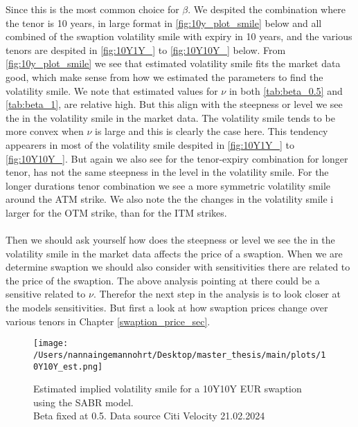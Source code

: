 Since this is the most common choice for $\beta$. We despited the combination where the tenor is 10 years, in large format in 
\autoref{fig:10y_plot_smile} below and all combined of the swaption volatility smile with expiry in 10 years, and the 
various tenors are despited in \autoref{fig:10Y1Y_} to \autoref{fig:10Y10Y_} below. 
From \autoref{fig:10y_plot_smile}  we see that estimated volatility smile fits the market data good, which make sense from 
how we estimated the parameters to find the volatility smile. We note that estimated values for $\nu$ in both 
\autoref{tab:beta_0.5} and \autoref{tab:beta_1}, are relative high. But this align with the steepness or level we see the in the 
volatility smile in the market data. The volatility smile tends to be more convex when $\nu$ is large and this is clearly 
the case here. This tendency appearers in  most of the volatility smile despited in \autoref{fig:10Y1Y_} to \autoref{fig:10Y10Y_}.
But again we also see for the tenor-expiry combination for longer tenor, has not the same steepness in the level in 
the volatility smile. For the longer durations tenor combination we see a more symmetric volatility smile around the
ATM strike. We also note the the changes in the volatility smile i larger for the OTM strike, than for the ITM strikes. 
\\\\
Then we should ask yourself how does the  steepness or level we see the in the 
volatility smile in the market data affects the price of a swaption. When we are determine swaption we should also consider 
with sensitivities there are related to the price of the swaption. The above analysis pointing at there could 
be a sensitive related to $\nu$. Therefor the next step in the analysis is to look closer at the models sensitivities. 
But first a look at how swaption prices change over various tenors in Chapter \ref{swaption_price_sec}.

\begin{figure}[H]
    \centering
    \texttt{[image: /Users/nannaingemannohrt/Desktop/master\_thesis/main/plots/10Y10Y\_est.png]}
    \caption{Estimated implied volatility smile for a 10Y10Y EUR swaption using the SABR model. \\Beta fixed at 0.5.
    Data source Citi Velocity 21.02.2024}
    \label{fig:10y_plot_smile}
\end{figure}
\noindent


